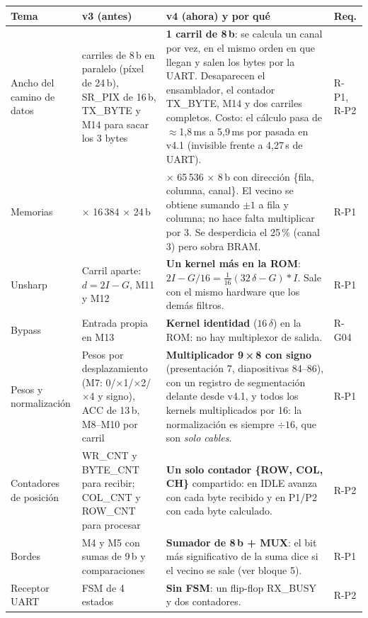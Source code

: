 \documentclass[11pt,a4paper]{article}
\begin{document}
\begin{center}
\small
\begin{tabularx}{\linewidth}{>{\raggedright\arraybackslash}p{2.7cm}>{\raggedright\arraybackslash}X>{\raggedright\arraybackslash}X>{\raggedright\arraybackslash}p{1.6cm}}
\toprule
\textbf{Tema} & \textbf{v3 (antes)} & \textbf{v4 (ahora) y por qué} & \textbf{Req.} \\
\midrule
Ancho del camino de datos & 3 carriles de 8\,b en paralelo (píxel de 24\,b), SR\_PIX de 16\,b, TX\_BYTE y M14 para sacar los 3 bytes & \textbf{1 carril de 8\,b}: se calcula un canal por vez, en el mismo orden en que llegan y salen los bytes por la UART. Desaparecen el ensamblador, el contador TX\_BYTE, M14 y dos carriles completos. Costo: el cálculo pasa de $\approx$1,8\,ms a 5,9\,ms por pasada en v4.1 (invisible frente a 4,27\,s de UART). & R-P1, R-P2 \\
Memorias & 2 × 16\,384 × 24\,b & 2 × 65\,536 × 8\,b con dirección \{fila, columna, canal\}. El vecino se obtiene sumando $\pm1$ a fila y columna; no hace falta multiplicar por 3. Se desperdicia el 25\,\% (canal 3) pero sobra BRAM. & R-P1 \\
Unsharp & Carril aparte: $d = 2I - G$, M11 y M12 & \textbf{Un kernel más en la ROM}: $2I - G/16 = \tfrac{1}{16}(32\,\delta - G) * I$. Sale con el mismo hardware que los demás filtros. & R-P1 \\
Bypass & Entrada propia en M13 & \textbf{Kernel identidad} ($16\,\delta$) en la ROM: no hay multiplexor de salida. & R-G04 \\
Pesos y normalización & Pesos por desplazamiento (M7: 0/×1/×2/×4 y signo), ACC de 13\,b, M8–M10 por carril & \textbf{Multiplicador 9\,×\,8 con signo} (presentación 7, diapositivas 84–86), con un registro de segmentación delante desde v4.1, y todos los kernels multiplicados por 16: la normalización es siempre $\div 16$, que son \emph{solo cables}. & R-P1 \\
Contadores de posición & WR\_CNT y BYTE\_CNT para recibir; COL\_CNT y ROW\_CNT para procesar & \textbf{Un solo contador \{ROW, COL, CH\}} compartido: en IDLE avanza con cada byte recibido y en P1/P2 con cada byte calculado. & R-P2 \\
Bordes & M4 y M5 con sumas de 9\,b y comparaciones & \textbf{Sumador de 8\,b + MUX}: el bit más significativo de la suma dice si el vecino se sale (ver bloque 5). & R-P1 \\
Receptor UART & FSM de 4 estados & \textbf{Sin FSM}: un flip-flop RX\_BUSY y dos contadores. & R-P2 \\

\end{tabularx}
\end{center}
\end{document}
